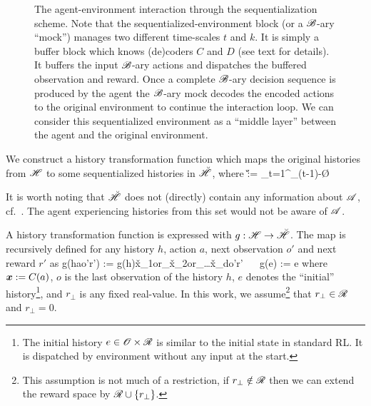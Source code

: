 \documentclass{article} %
\let\defOrg\definition
\let\enddefOrg\enddefinition
\renewenvironment{definition}{\begin{tcolorbox}\defOrg}{\enddefOrg\end{tcolorbox}}
\begin{document}
\begin{figure}[!ht]
\caption{The agent-environment interaction through the sequentialization scheme. Note that the sequentialized-environment block (or a $\mathscr{B}$-ary ``mock'') manages two different time-scales $t$ and $k$. It is simply a buffer block which knows (de)coders $C$ and $D$ (see text for details). It buffers the input $\mathscr{B}$-ary actions and dispatches the buffered observation and reward. Once a complete $\mathscr{B}$-ary decision sequence is produced by the agent the $\mathscr{B}$-ary mock decodes the encoded actions to the original environment to continue the interaction loop. We can consider this sequentialized environment as a ``middle layer'' between the agent and the original environment.}
\label{fig:bianary-interaction}
\end{figure}


We construct a history transformation function which maps the original histories from $\mathscr{H}$ to some sequentialized histories in $\breve{\mathscr{H}}$, where
\beq
\u \H := \bigcup_{t=1}^\infty \underbrace{\O \times \R \times \B \times \dots \times \O \times \R \times \B}_{(t-1)-}\times\O\times\R
\eeq

It is worth noting that $\breve{\mathscr{H}}$ does not (directly) contain any information about $\mathscr{A}$, cf.\ . The agent experiencing histories from this set would not be aware of $\mathscr{A}$.

\begin{definition}[History transformation function]
A history transformation function is expressed with $g : \mathscr{H} \to \breve{\mathscr{H}}$. The map is recursively defined for any history $h$, action $a$, next observation $o'$ and next reward $r'$ as
\beq
g(hao'r') := g(h)\v x_1or_\bot\v x_2or_\bot \dots \v x_do'r' \  \ g(e) := e
\eeq
where $\boldsymbol{x} := C(a)$, $o$ is the last observation of the history $h$, $e$ denotes the ``initial'' history\footnote{The initial history $e \in \mathscr{O} \times \mathscr{R}$ is similar to the initial state in standard RL. It is dispatched by environment without any input at the start.}, and $r_\bot$ is any fixed real-value. In this work, we assume\footnote{This assumption is not much of a restriction, if $r_\bot \notin \mathscr{R}$ then we can extend the reward space by $\mathscr{R} \cup \{r_\bot\}$.} that $r_\bot \in \mathscr{R}$ and $r_\bot = 0$.
\end{definition}
\end{document}
